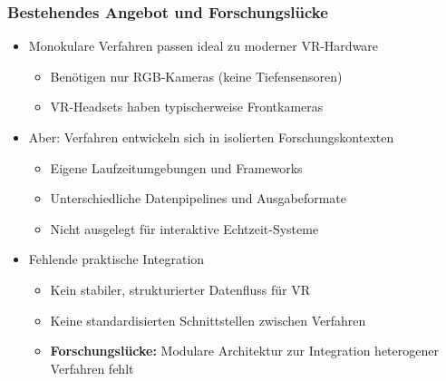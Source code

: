 \begin{frame}
\frametitle{Bestehendes Angebot und Forschungslücke}

\begin{itemize}
  \item Monokulare Verfahren passen ideal zu moderner VR-Hardware
  \begin{itemize}
    \item Benötigen nur RGB-Kameras (keine Tiefensensoren)
    \item VR-Headsets haben typischerweise Frontkameras
  \end{itemize}
  
  \item Aber: Verfahren entwickeln sich in isolierten Forschungskontexten
  \begin{itemize}
    \item Eigene Laufzeitumgebungen und Frameworks
    \item Unterschiedliche Datenpipelines und Ausgabeformate
    \item Nicht ausgelegt für interaktive Echtzeit-Systeme
  \end{itemize}
  
  \item Fehlende praktische Integration
  \begin{itemize}
    \item Kein stabiler, strukturierter Datenfluss für VR
    \item Keine standardisierten Schnittstellen zwischen Verfahren
    \item \textbf{Forschungslücke:} Modulare Architektur zur Integration heterogener Verfahren fehlt
  \end{itemize}
\end{itemize}

\end{frame}

